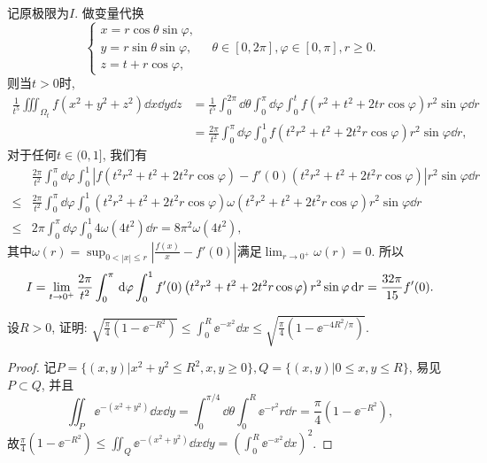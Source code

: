 \begin{quiza}
\begin{solution}
记原极限为\(I\). 做变量代换\[\begin{cases}
x=r\cos\theta\sin\varphi,\\
y=r\sin\theta\sin\varphi,\\
z=t+r\cos\varphi,
\end{cases}\quad\theta\in[0,2\pi],\varphi\in[0,\pi],r\geqslant 0.\]则当\(t>0\)时,\[\begin{split}
\frac{1}{t^5}\iiint_{\varOmega_t}f(x^2+y^2+z^2)\dd x\dd y\dd z&=\frac{1}{t^5}\int_{0}^{2\pi}\dd\theta\int_{0}^{\pi}\dd\varphi\int_{0}^{t}f(r^2+t^2+2tr\cos\varphi)r^2\sin\varphi\dd r\\
&=\frac{2\pi}{t^2}\int_{0}^{\pi}\dd\varphi\int_{0}^{1}f(t^2r^2+t^2+2t^2r\cos\varphi)r^2\sin\varphi\dd r,
\end{split}\]
对于任何\(t\in(0,1]\), 我们有\[\begin{split}
&\frac{2\pi}{t^2}\int_{0}^{\pi}\dd\varphi\int_{0}^{1}\left|f(t^2r^2+t^2+2t^2r\cos\varphi)-f'(0)(t^2r^2+t^2+2t^2r\cos\varphi)\right|r^2\sin\varphi\dd r\\
\leqslant&\frac{2\pi}{t^2}\int_{0}^{\pi}\dd\varphi\int_{0}^{1}(t^2r^2+t^2+2t^2r\cos\varphi)\omega(t^2r^2+t^2+2t^2r\cos\varphi)r^2\sin\varphi\dd r\\
\leqslant&2\pi\int_{0}^{\pi}\dd\varphi\int_{0}^{1}4\omega\left(4t^2\right)\dd r=8\pi^2\omega\left(4t^2\right),
\end{split}\]
其中\(\omega(r)=\sup_{0<|x|\leqslant r}\left|\frac{f(x)}{x}-f'(0)\right|\)满足\(\lim_{r\rightarrow0^+}\omega(r)=0.\) 所以\[I=\lim_{t\rightarrow 0^+}\frac{2\pi}{t^2}\int_{0}^{\pi}\,\mathrm{d}\varphi\int_{0}^{1}f'(0)\left(t^2r^2+t^2+2t^2r\cos\varphi\right)r^2\sin\varphi\,\mathrm{d} r=\frac{32\pi}{15}f'(0).\qedhere\]
\end{solution}
\woe 设\(R>0\), 证明: \(\sqrt{\frac{\pi}{4}(1-\ee^{-R^2})}\leqslant\int_{0}^{R}\ee^{-x^2}\dd x\leqslant\sqrt{\frac{\pi}{4}\left(1-\ee^{-4R^2/\pi}\right)}\).
\begin{proof}
记\(P=\{(x,y)\big|x^2+y^2\leqslant R^2,x,y\geqslant 0\},Q=\{(x,y)\big|0\leqslant x,y\leqslant R\}\), 易见\(P\subset Q\), 并且\[\iint_{P}\ee^{-(x^2+y^2)}\dd x\dd y=\int_{0}^{\pi/4}\dd\theta\int_{0}^{R}\ee^{-r^2}r\dd r=\frac{\pi}{4}\left(1-\ee^{-R^2}\right),\]故\(\frac{\pi}{4}\left(1-\ee^{-R^2}\right)\leqslant\iint_{Q}\ee^{-(x^2+y^2)}\dd x\dd y=\left(\int_{0}^{R}\ee^{-x^2}\dd x\right)^2\). 


\end{proof}
\end{quiza}
